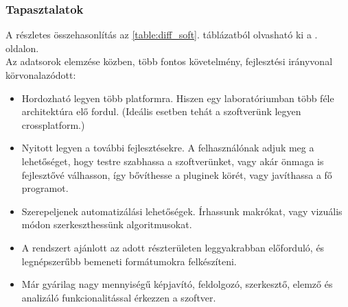\documentclass[a4paper,12pt,oneside]{report}
\begin{document}
\subsubsection{Tapasztalatok}
A részletes összehasonlítás az \ref{table:diff_soft}. táblázatból olvasható ki a \pageref{table:diff_soft}. oldalon.\\
Az adatsorok elemzése közben, több fontos követelmény, fejlesztési irányvonal körvonalazódott:
\begin{itemize}
	\itemsep0em
	\item Hordozható legyen több platformra. Hiszen egy laboratóriumban több féle architektúra elő fordul. (Ideális esetben tehát a szoftverünk legyen crossplatform.)
	\item Nyitott legyen a további fejlesztésekre. A felhasználónak adjuk meg a lehetőséget, hogy testre szabhassa a szoftverünket, vagy akár önmaga is fejlesztővé válhasson, így bővíthesse a pluginek körét, vagy javíthassa a fő programot.

	\item Szerepeljenek automatizálási lehetőségek. Írhassunk makrókat, vagy vizuális módon szerkeszthessünk algoritmusokat.
	\item A rendszert ajánlott az adott részterületen leggyakrabban előforduló, és legnépszerűbb bemeneti formátumokra felkészíteni.
	\item Már gyárilag nagy mennyiségű képjavító, feldolgozó, szerkesztő, elemző és analizáló funkcionalitással érkezzen a szoftver.

\end{itemize}
\end{document}
